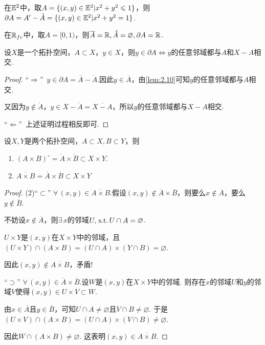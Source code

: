 \begin{instance}
    在$\mathbb{E}^2$中，取$A=\{(x,y)\in\mathbb{E}^2|x^2+y^2\leqslant 1\}$，则$\partial A=A'-\mathring{A}=\{(x,y)\in\mathbb{E}^2|x^2+y^2=1\}$.
\end{instance}

\begin{instance}
    在$\mathbb{R}_{fc}$中，取$A=[0,1)$，则$\overline{A}=\mathbb{R},\mathring{A}=\varnothing,\partial A=\mathbb{R}$.
\end{instance}

\begin{lemma}[][lem:2.11]
    设$X$是一个拓扑空间，$A\subset X$，$y\in X$，则$y\in\partial A\Leftrightarrow y$的任意邻域都与$A$和$X-A$相交.
\end{lemma}
\begin{proof}
    “$\Rightarrow$”\, $y\in\partial A=\overline{A}-\mathring{A}$.因此$y\in\overline{A}$，由\cref{lem:2.10}可知$y$的任意邻域都与$A$相交.\par
    又因为$y\notin\mathring{A}$，$y\in X-\mathring{A}=\overline{X-A}$，所以$y$的任意邻域都与$X-A$相交. \par
    “$\Leftarrow$”\, 上述证明过程相反即可.
\end{proof}



\begin{proposition}[][prop:2.11]
    设$X,Y$是两个拓扑空间，$A\subset X,B\subset Y$，则
    \begin{enumerate}[(1)]
        \item $(A\times B)^\circ=\mathring{A}\times \mathring{B}\subset X\times Y$.
        \item $\overline{A\times B}=\overline{A}\times \overline{B}\subset X\times Y$
    \end{enumerate}
\end{proposition}
\begin{proof}
    (2)“$\subset$” $\forall\, (x,y)\in\overline{A\times B}$.假设$(x,y)\notin\overline{A}\times\overline{B}$，则要么$x\notin\overline{A}$，要么$y\notin\overline{B}$.\par
    不妨设$x\notin\overline{A}$，则$\exists\, x$的邻域$U,\operatorname{\,\text{s.t.}} U\cap A=\varnothing$.\par
    $U\times Y$是$(x,y)$在$X\times Y$中的邻域，且$(U\times Y)\cap(A\times B)=(U\cap A)\times (Y\cap B)=\varnothing$.\par
    因此$(x,y)\notin \overline{A\times B}$，矛盾! \par
    “$\supset$” $\forall\,(x,y)\in\overline{A}\times\overline{B}$.设$W$是$(x,y)$在$X\times Y$中的邻域. 则存在$x$的邻域$U$和$y$的邻域$V$使得$(x,y)\in U\times V\subset W$.\par
    由$x\in\overline{A}$且$y\in\overline{B}$，可知$U\cap A\neq\varnothing$且$V\cap B\neq\varnothing$. 于是$(U\times V)\cap(A\times B)=(U\cap A)\times(V\cap B)\neq\varnothing$.\par
    因此$W\cap(A\times B)\neq\varnothing$. 这表明$(x,y)\in\overline{A\times B}$.
\end{proof}











